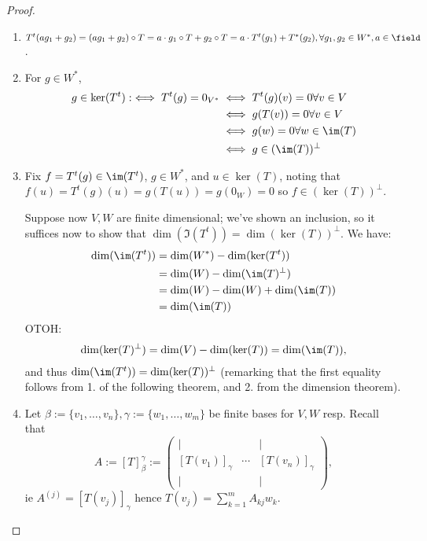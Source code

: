 \begin{proof}
    \begin{enumerate}
        \item $T^t(ag_1 + g_2) = (ag_1 + g_2)\circ T = a \cdot g_1 \circ T + g_2 \circ T = a \cdot T^{t}(g_1) + T^\ast(g_2), \forall g_1, g_2 \in W^\ast, a \in \field$.
        \item For $g \in W^\ast$, \begin{align*}
            g \in \ker(T^t) :\iff T^t(g) = 0_{V^\ast} &\iff T^t(g)(v) = 0 \forall v \in V\\
            &\iff g(T(v)) = 0 \forall v \in V\\
            &\iff g(w) = 0 \forall w \in \im(T)\\
            &\iff g \in (\im(T))^\perp
        \end{align*}
        \item Fix $f = T^t(g) \in \im(T^t)$, $g \in W^\ast$, and $u \in \ker(T)$, noting that $f(u) = T^t(g)(u) = g(T(u)) = g(0_W) = 0$ so $f \in (\ker(T))^\perp$.
        
        Suppose now $V, W$ are finite dimensional; we've shown an inclusion, so it suffices now to show that $\dim(\Im(T^t)) = \dim(\ker(T))^\perp$. We have:
        \begin{align*}
            \dim(\im(T^t)) &= \dim(W^\ast) - \dim(\ker(T^t)) \\
            &= \dim(W) - \dim(\im(T)^\perp) \\
            &= \dim(W) - \dim(W) + \dim(\im(T))\\ 
            &= \dim(\im(T))
        \end{align*}
        OTOH:
        \begin{align*}
            \dim(\ker(T)^\perp) = \dim(V) - \dim(\ker(T)) = \dim(\im(T)),
        \end{align*}
        and thus $\dim(\im(T^t)) = \dim(\ker(T))^\perp$ (remarking that the first equality follows from 1. of the following theorem, and 2. from the dimension theorem).

        \item Let $\beta :=\{v_1, \dots, v_n\}, \gamma := \{w_1, \dots, w_m\}$ be finite bases for $V, W$ resp. Recall that $$A := [T]_\beta^\gamma := \begin{pmatrix}
            \vert & & \vert\\
            [T(v_1)]_\gamma & \cdots & [T(v_n)]_\gamma\\
            \vert & & \vert
        \end{pmatrix},$$
        ie $A^{(j)} = [T(v_j)]_\gamma$ hence $T(v_j) = \sum_{k=1}^m A_{kj} w_k$.


\end{enumerate}
\end{proof}
